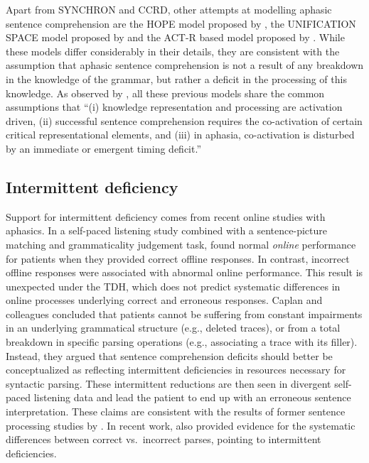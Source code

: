 \documentclass{cambridge7A}\usepackage[]{graphicx}\usepackage[]{color}
\begin{document}
Apart from SYNCHRON and CCRD, other attempts at modelling aphasic sentence comprehension are the HOPE model proposed by \cite{Gigley-1986}, the UNIFICATION SPACE model proposed by \cite{Kempen-Vosse-1989,vossekempen2000} and the ACT-R based model proposed by \cite{Crescentini-Stocco-2005}. While these models differ considerably in their details, they are consistent with the assumption that aphasic sentence comprehension is not a result of any breakdown in the knowledge of the grammar, but rather a deficit in the processing of this knowledge. As observed by \cite[p.~82][]{Haarmann-EtAl-1997}, 
all these previous models share the common assumptions that ``(i) knowledge representation and processing are activation driven, (ii) successful sentence comprehension requires the co-activation of certain critical representational elements, and (iii) in aphasia, co-activation is disturbed by an immediate or emergent timing deficit.'' 

\subsection{Intermittent deficiency}
Support for intermittent deficiency comes from recent online studies with aphasics. In a self-paced listening study combined with a sentence-picture matching and grammaticality judgement task, \cite{Caplan:2007} found normal \textit{online} performance for patients when they provided correct offline responses. In contrast, incorrect offline responses were associated with abnormal online performance. This result is unexpected under the TDH, which does not predict systematic differences in online processes underlying correct and erroneous responses. Caplan and colleagues concluded that patients cannot be suffering from constant impairments in an underlying grammatical structure (e.g., deleted traces), or from a total breakdown in specific parsing operations (e.g., associating a trace with its filler). Instead, they argued that sentence comprehension deficits should better be conceptualized as reflecting intermittent deficiencies in resources necessary for syntactic parsing. These intermittent reductions are then seen in divergent self-paced listening data and lead the patient to end up with an erroneous sentence interpretation. These claims are consistent with the results of former sentence processing studies by \cite{Caplan:2003,Caplan:1995}.
In recent work, \cite{hanneetal11} also provided evidence for the systematic differences between correct vs.\ incorrect parses, pointing to intermittent deficiencies.
\end{document}
